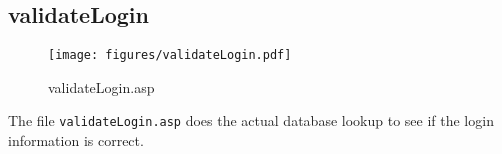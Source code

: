 \subsection{validateLogin}
\begin{figure}[htb]
    \begin{center}
        \texttt{[image: figures/validateLogin.pdf]}
    \end{center}
    \caption{validateLogin.asp}
    \label{fig:validateLogin}
\end{figure}

The file \verb|validateLogin.asp| does the actual database lookup to see if the
login information is correct.
